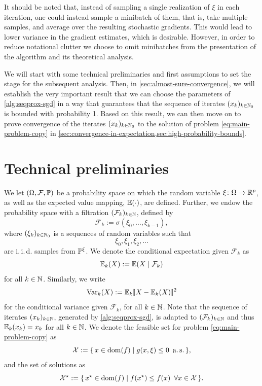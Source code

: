 It should be noted that, instead of sampling a single realization of $\xi$ in each iteration,
one could instead sample a minibatch of them, that is, take multiple samples, and
average over the resulting stochastic gradients. This would lead to lower variance
in the gradient estimates, which is desirable. However, in order to reduce notational clutter
we choose to omit minibatches from the presentation of the algorithm and its theoretical
analysis.

We will start with some technical preliminaries and first assumptions to set the stage
for the subsequent analysis. Then, in \cref{sec:almost-sure-convergence},
we will establish the very important result that we can choose the parameters
of \cref{alg:seqprox-sgd} in a way that guarantees that the sequence
of iterates $(x_k)_{k\in\mathbb{N}_0}$ is bounded with probability 1.
Based on this result, we can then move on to prove convergence
of the iterates $(x_k)_{k\in\mathbb{N}_0}$ to the solution of
problem \eqref{eq:main-problem-copy} in
\cref{sec:convergence-in-expectation,sec:high-probability-bounds}.

\section{Technical preliminaries}

We let $(\Omega, \mathcal{F}, \mathbb{P})$ be a
probability space on which the random variable $\xi\colon\Omega\to\mathbb{R}^p$,
as well as the expected value mapping, $\mathbb{E}(\cdot)$,
are defined.
Further, we endow the probability space with a filtration $(\mathcal{F}_k)_{k\in\mathbb{N}}$,
defined by
\[
    \mathcal{F}_k := \sigma(\xi_0, \dots, \xi_{k-1}),
\]
where $(\xi_k)_{k\in\mathbb{N}_0}$ is a sequences of
random variables such that
\[
    \xi_0, \xi_1, \xi_2, \dots
\]
are i.\,i.\,d. samples from $\mathbb{P}^{\xi}$.
We denote the conditional expectation given $\mathcal{F}_k$ as
\[
    \mathbb{E}_k(X) := \mathbb{E}(X \mid \mathcal{F}_k)
\]
for all $k\in\mathbb{N}$. Similarly, we write
\[
    \operatorname{Var}_k(X) := \mathbb{E}_k|\!|X - \mathbb{E}_k(X)|\!|^2
\]
for the conditional variance given $\mathcal{F}_k$, for all $k\in\mathbb{N}$.
Note that the sequence of iterates $(x_k)_{k\in\mathbb{N}}$, generated by \cref{alg:seqprox-sgd},
is adapted to $(\mathcal{F}_k)_{k\in\mathbb{N}}$ and thus $\mathbb{E}_k(x_k) = x_k$ for all $k\in\mathbb{N}$.
We denote the feasible set for problem \eqref{eq:main-problem-copy} as
\[
    \mathcal{X} := \{\, x\in\operatorname{dom}(f) \mid g(x, \xi) \leq 0 \enspace \textnormal{a.\,s.} \,\},
\]
and the set of solutions as
\[
    \mathcal{X}^\star := \{\, x^\star\in\operatorname{dom}(f) \mid f(x^\star) \leq f(x) \enspace \forall x\in\mathcal{X} \,\}.
\]

